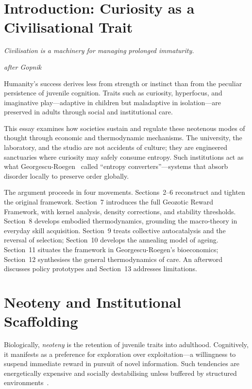 \documentclass[12pt,a4paper]{article}
\theoremstyle{definition}
\begin{document}
\tableofcontents
\newpage

\section{Introduction: Curiosity as a Civilisational Trait}

\epigraph{\itshape Civilisation is a machinery for managing prolonged
immaturity.}{\textit{after Gopnik}}

Humanity's success derives less from strength or instinct than from the peculiar
persistence of juvenile cognition.  Traits such as curiosity, hyperfocus, and
imaginative play---adaptive in children but maladaptive in isolation---are
preserved in adults through social and institutional care.

This essay examines how societies sustain and regulate these neotenous modes of
thought through economic and thermodynamic mechanisms.  The university, the
laboratory, and the studio are not accidents of culture; they are engineered
sanctuaries where curiosity may safely consume entropy.  Such institutions act
as what Georgescu-Roegen~\citeyearpar{georgesuroegen1971} called ``entropy
converters''---systems that absorb disorder locally to preserve order globally.

The argument proceeds in four movements.  Sections~2--6 reconstruct and
tighten the original framework.  Section~7 introduces the full Geozotic Reward
Framework, with kernel analysis, density corrections, and stability thresholds.
Section~8 develops embodied thermodynamics, grounding the macro-theory in
everyday skill acquisition.  Section~9 treats collective autocatalysis and the
reversal of selection; Section~10 develops the annealing model of ageing.
Section~11 situates the framework in Georgescu-Roegen's bioeconomics; Section~12
synthesises the general thermodynamics of care.  An afterword discusses
policy prototypes and Section~13 addresses limitations.

\section{Neoteny and Institutional Scaffolding}

Biologically, \emph{neoteny} is the retention of juvenile traits into
adulthood.  Cognitively, it manifests as a preference for exploration over
exploitation---a willingness to suspend immediate reward in pursuit of novel
information.  Such tendencies are energetically expensive and socially
destabilising unless buffered by structured environments~\citep{gopnik2025}.
\end{document}
